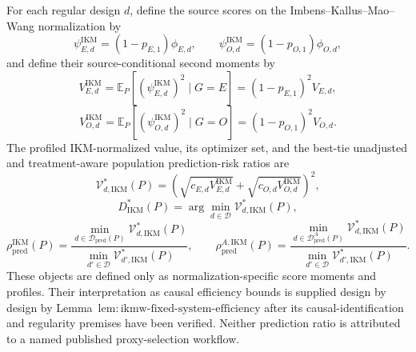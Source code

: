 For each regular design \(d\), define the source scores on the Imbens--Kallus--Mao--Wang normalization by
\[
 \psi_{E,d}^{\mathrm{IKM}}=(1-p_{E,1})\phi_{E,d},
 \qquad
 \psi_{O,d}^{\mathrm{IKM}}=(1-p_{O,1})\phi_{O,d},
\]
and define their source-conditional second moments by
\[
 V_{E,d}^{\mathrm{IKM}}
 =\mathbb E_P[(\psi_{E,d}^{\mathrm{IKM}})^2\mid G=E]
 =(1-p_{E,1})^2V_{E,d},
\]
\[
 V_{O,d}^{\mathrm{IKM}}
 =\mathbb E_P[(\psi_{O,d}^{\mathrm{IKM}})^2\mid G=O]
 =(1-p_{O,1})^2V_{O,d}.
\]
The profiled IKM-normalized value, its optimizer set, and the best-tie unadjusted and treatment-aware population prediction-risk ratios are
\[
 \mathcal V_{d,\mathrm{IKM}}^*(P)
 =\left(
 \sqrt{c_{E,d}V_{E,d}^{\mathrm{IKM}}}
 +\sqrt{c_{O,d}V_{O,d}^{\mathrm{IKM}}}
 \right)^2,
\]
\[
 D_{\mathrm{IKM}}^*(P)
 =\arg\min_{d\in\mathcal D}\mathcal V_{d,\mathrm{IKM}}^*(P),
\]
\[
 \rho_{\mathrm{pred}}^{\mathrm{IKM}}(P)
 =\frac{\min_{d\in\mathcal D_{\mathrm{pred}}(P)}
 \mathcal V_{d,\mathrm{IKM}}^*(P)}
 {\min_{d'\in\mathcal D}\mathcal V_{d',\mathrm{IKM}}^*(P)},
 \qquad
 \rho_{\mathrm{pred}}^{A,\mathrm{IKM}}(P)
 =\frac{\min_{d\in\mathcal D_{\mathrm{pred}}^A(P)}
 \mathcal V_{d,\mathrm{IKM}}^*(P)}
 {\min_{d'\in\mathcal D}\mathcal V_{d',\mathrm{IKM}}^*(P)}.
\]
These objects are defined only as normalization-specific score moments and profiles. Their interpretation as causal efficiency bounds is supplied design by design by Lemma~\(\mathrm{lem{:}ikmw\text{-}fixed\text{-}system\text{-}efficiency}\) after its causal-identification and regularity premises have been verified. Neither prediction ratio is attributed to a named published proxy-selection workflow.